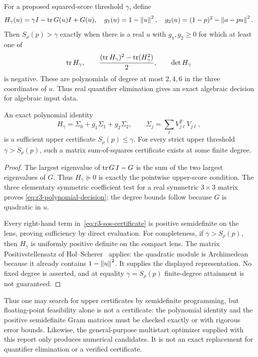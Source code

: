 \begin{proposition}
\label{prop:r3-certificates}
For a proposed squared-score threshold $\gamma$, define
\[
 H_\gamma(u)=\gamma I-\operatorname{tr} G(u)I+G(u),\quad
 g_1(u)=1-\left\lVert u\right\rVert^2,\quad
 g_2(u)=(1-p)^2-\left\lVert a-pu\right\rVert^2.
\]
Then $S_\rho(p)>\gamma$ exactly when there is a real $u$ with
$g_1,g_2\ge0$ for which at least one of
\begin{equation}
 \operatorname{tr} H_\gamma,\qquad
 \frac{(\operatorname{tr} H_\gamma)^2-\operatorname{tr}(H_\gamma^2)}2,\qquad
 \det H_\gamma
 \label{eq:r3-polynomial-decision}
\end{equation}
is negative. These are polynomials of degree at most $2,4,6$ in
the three coordinates of $u$. Thus real quantifier elimination gives
an exact algebraic decision for algebraic input data.

An exact polynomial identity
\begin{equation}
 H_\gamma=\Sigma_0+g_1\Sigma_1+g_2\Sigma_2,
 \qquad \Sigma_j=\sum_\ell V_{j\ell}^TV_{j\ell},
 \label{eq:r3-sos-certificate}
\end{equation}
is a sufficient upper certificate $S_\rho(p)\le\gamma$.
For every strict upper threshold $\gamma>S_\rho(p)$, such a
matrix sum-of-squares certificate exists at some finite degree.
\end{proposition}

\begin{proof}
The largest eigenvalue of $\operatorname{tr} G\,I-G$ is the sum of the two largest
eigenvalues of $G$. Thus $H_\gamma\succeq0$ is exactly the
pointwise upper-score condition. The three elementary symmetric
coefficient test for a real symmetric $3\times3$ matrix proves
\eqref{eq:r3-polynomial-decision}; the degree bounds follow because
$G$ is quadratic in $u$.

Every right-hand term in~\eqref{eq:r3-sos-certificate} is positive
semidefinite on the lens, proving sufficiency by direct evaluation.
For completeness, if $\gamma>S_\rho(p)$, then $H_\gamma$ is
uniformly positive definite on the compact lens.
The matrix Positivstellensatz of Hol--Scherer~\cite{holscherer2005}
applies: the quadratic module is Archimedean because it already
contains $1-\left\lVert u\right\rVert^2$.
It supplies the displayed representation. No fixed degree is asserted,
and at equality $\gamma=S_\rho(p)$ finite-degree attainment is not
guaranteed.
\end{proof}

Thus one may search for upper certificates by semidefinite programming,
but floating-point feasibility alone is not a certificate: the
polynomial identity and the positive semidefinite Gram matrices must
be checked exactly or with rigorous error bounds. Likewise, the
general-purpose multistart optimizer supplied with this report only
produces numerical candidates. It is not an exact replacement for
quantifier elimination or a verified certificate.

